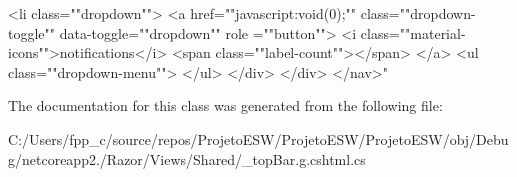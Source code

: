 \begin{DoxyCode}
                <li \textcolor{keyword}{class}=\textcolor{stringliteral}{""}dropdown\textcolor{stringliteral}{""}>
                    <a href=\textcolor{stringliteral}{""}javascript:void(0);\textcolor{stringliteral}{""} \textcolor{keyword}{class}=\textcolor{stringliteral}{""}dropdown-toggle\textcolor{stringliteral}{""} data-toggle=\textcolor{stringliteral}{""}dropdown\textcolor{stringliteral}{""} role
      =\textcolor{stringliteral}{""}button\textcolor{stringliteral}{""}>
                        <i \textcolor{keyword}{class}=\textcolor{stringliteral}{""}material-icons\textcolor{stringliteral}{""}>notifications</i>
                        <span \textcolor{keyword}{class}=\textcolor{stringliteral}{""}label-count\textcolor{stringliteral}{""}></span>
                    </a>
                    <ul \textcolor{keyword}{class}=\textcolor{stringliteral}{""}dropdown-menu\textcolor{stringliteral}{""}>
                    </ul>
        </div>
    </div>
</nav>\textcolor{stringliteral}{"}
\end{DoxyCode}


The documentation for this class was generated from the following file\+:\begin{DoxyCompactItemize}
\item 
C\+:/\+Users/fpp\+\_\+c/source/repos/\+Projeto\+E\+S\+W/\+Projeto\+E\+S\+W/\+Projeto\+E\+S\+W/obj/\+Debug/netcoreapp2./\+Razor/\+Views/\+Shared/\+\_\+top\+Bar.\+g.\+cshtml.\+cs\end{DoxyCompactItemize}
